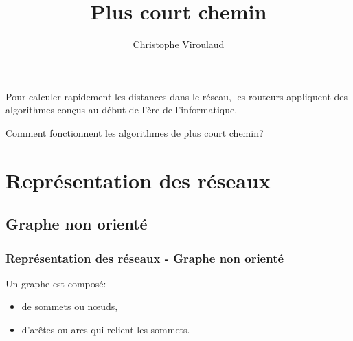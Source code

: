 \documentclass[svgnames,11pt]{beamer}
\author[]{Christophe Viroulaud}
\title{Plus court chemin}
\date{\framebox{\textbf{Archi 15}}}
\institute{Terminale - NSI}
\begin{document}
\begin{frame}
\titlepage
\end{frame}

\begin{frame}
Pour calculer rapidement les distances dans le réseau, les routeurs appliquent des algorithmes conçus au début de l'ère de l'informatique.
\begin{framed}
    \centering Comment fonctionnent les algorithmes de plus court chemin?
\end{framed}
\end{frame}

\section{Représentation des réseaux}
\subsection{Graphe non orienté}
\begin{frame}
    \frametitle{Représentation des réseaux - Graphe non orienté}

    \begin{center}
        \label{oriente}
    \end{center}
\begin{aretenir}[]
    Un graphe est composé:
    \begin{itemize}
        \item de sommets ou nœuds,
        \item d'arêtes ou arcs qui relient les sommets.
    \end{itemize}
\end{aretenir}
\end{frame}
\end{document}
